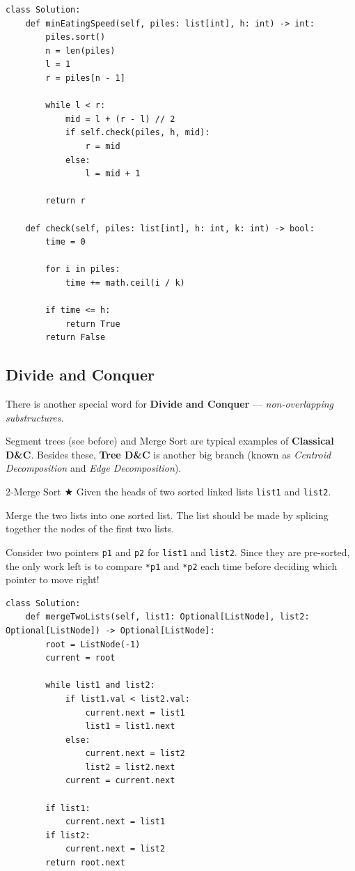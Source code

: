 \documentclass{article}
\begin{document}
\begin{lstlisting}[style=python]
class Solution:
    def minEatingSpeed(self, piles: list[int], h: int) -> int:
        piles.sort()
        n = len(piles)
        l = 1
        r = piles[n - 1]
        
        while l < r:
            mid = l + (r - l) // 2
            if self.check(piles, h, mid):
                r = mid
            else:
                l = mid + 1
                
        return r

    def check(self, piles: list[int], h: int, k: int) -> bool:
        time = 0
        
        for i in piles:
            time += math.ceil(i / k)    
            
        if time <= h:
            return True
        return False
\end{lstlisting}

\subsection{Divide and Conquer}

There is another special word for \textbf{Divide and Conquer} --- \emph{non-overlapping substructures}.

Segment trees (see before) and Merge Sort are typical examples of \textbf{Classical D\&C}. Besides these, \textbf{Tree D\&C} is another big branch (known as \emph{Centroid Decomposition} and \emph{Edge Decomposition}).

\begin{Question}{2-Merge Sort $\bigstar$}
Given the heads of two sorted linked lists \texttt{list1} and \texttt{list2}.

Merge the two lists into one sorted list. The list should be made by splicing together the nodes of the first two lists.
\end{Question}

Consider two pointers \texttt{p1} and \texttt{p2} for \texttt{list1} and \texttt{list2}. Since they are pre-sorted, the only work left is to compare \texttt{*p1} and \texttt{*p2} each time before deciding which pointer to move right!

\begin{lstlisting}[style=python]
class Solution:
    def mergeTwoLists(self, list1: Optional[ListNode], list2: Optional[ListNode]) -> Optional[ListNode]:
        root = ListNode(-1)
        current = root
        
        while list1 and list2:
            if list1.val < list2.val:
                current.next = list1
                list1 = list1.next
            else:
                current.next = list2
                list2 = list2.next
            current = current.next
            
        if list1:
            current.next = list1
        if list2:
            current.next = list2
        return root.next
\end{lstlisting}
\end{document}
